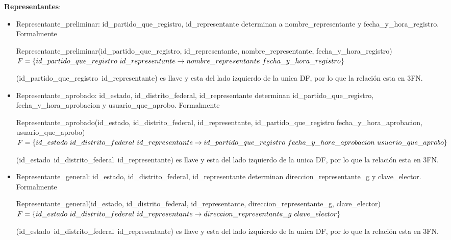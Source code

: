 \documentclass[a4paper,twoside,11pt]{article}
\begin{document}
\textbf{Representantes}:
\begin{itemize}
  \item Representante\_preliminar: id\_partido\_que\_registro, id\_representante determinan
        a nombre\_representante y fecha\_y\_hora\_registro. Formalmente

        Representante\_preliminar(id\_partido\_que\_registro, id\_representante,
        nombre\_representante, fecha\_y\_hora\_registro)\\
        $F=\{id\_partido\_que\_registro~id\_representante\rightarrow\\
        nombre\_representante~fecha\_y\_hora\_registro\}$

        (id\_partido\_que\_registro~id\_representante) es llave y esta del lado izquierdo de la unica DF,
        por lo que la relación esta en 3FN.

  \item Representante\_aprobado: id\_estado, id\_distrito\_federal, id\_representante determinan
        id\_partido\_que\_registro, fecha\_y\_hora\_aprobacion y usuario\_que\_aprobo. Formalmente

        Representante\_aprobado(id\_estado, id\_distrito\_federal, id\_representante, id\_partido\_que\_registro
        fecha\_y\_hora\_aprobacion, usuario\_que\_aprobo)\\
        $F=\{id\_estado~id\_distrito\_federal~id\_representante\rightarrow\\
        id\_partido\_que\_registro~fecha\_y\_hora\_aprobacion~usuario\_que\_aprobo\}$

        (id\_estado~id\_distrito\_federal~id\_representante) es llave y esta del lado izquierdo de la unica DF,
        por lo que la relación esta en 3FN.

  \item Representante\_general: id\_estado, id\_distrito\_federal, id\_representante determinan
        direccion\_representante\_g y clave\_elector. Formalmente

        Representante\_general(id\_estado, id\_distrito\_federal, id\_representante,
        direccion\_representante\_g, clave\_elector)\\
        $F=\{id\_estado~id\_distrito\_federal~id\_representante\rightarrow\\
        direccion\_representante\_g~clave\_elector\}$

        (id\_estado~id\_distrito\_federal~id\_representante) es llave y esta del lado izquierdo de la unica DF,
        por lo que la relación esta en 3FN.


\end{itemize}
\end{document}
